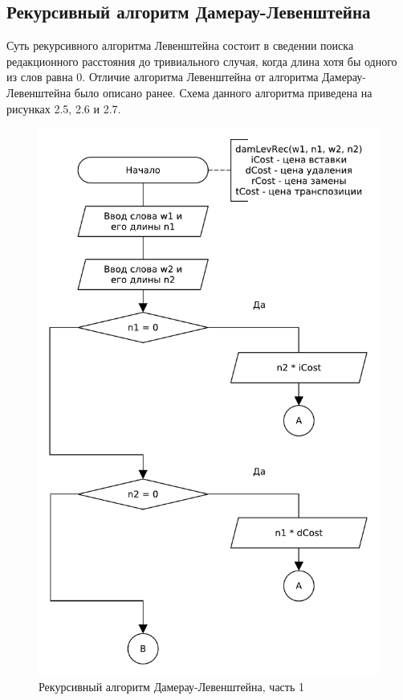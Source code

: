 \subsection{Рекурсивный алгоритм Дамерау-Левенштейна}
Суть рекурсивного алгоритма Левенштейна состоит в сведении поиска редакционного расстояния до тривиального случая, когда длина хотя бы одного из слов равна 0. Отличие алгоритма Левенштейна от алгоритма Дамерау-Левенштейна было описано ранее. Схема данного алгоритма приведена на рисунках 2.5, 2.6 и 2.7.
\begin{figure}[H]
    \centering
    \includegraphics[scale=0.75]{pdf/damerau-levenshteainrec-part1.pdf}
    \caption{Рекурсивный алгоритм Дамерау-Левенштейна, часть 1}
\end{figure}
